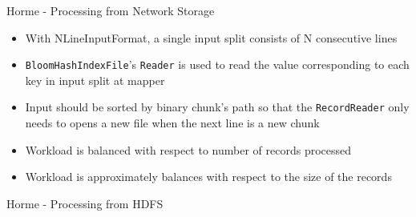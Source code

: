 \documentclass[newPxFont]{beamer}
\begin{document}
\begin{frame}[c]{Horme - Processing from Network Storage}
\begin{itemize}
  \item With NLineInputFormat, a single input split consists of N consecutive lines
  \item \texttt{BloomHashIndexFile}'s \texttt{Reader} is used to read the value corresponding to each key in input split at mapper
  \item Input should be sorted by binary chunk's path so that the \texttt{RecordReader} only needs to opens a new file when the next line is a new chunk
  \item Workload is balanced with respect to number of records processed
  \item Workload is approximately balances with respect to the size of the records 
\end{itemize}
\end{frame}

\begin{frame}[c]{Horme - Processing from HDFS}
  
\end{frame}
\end{document}
